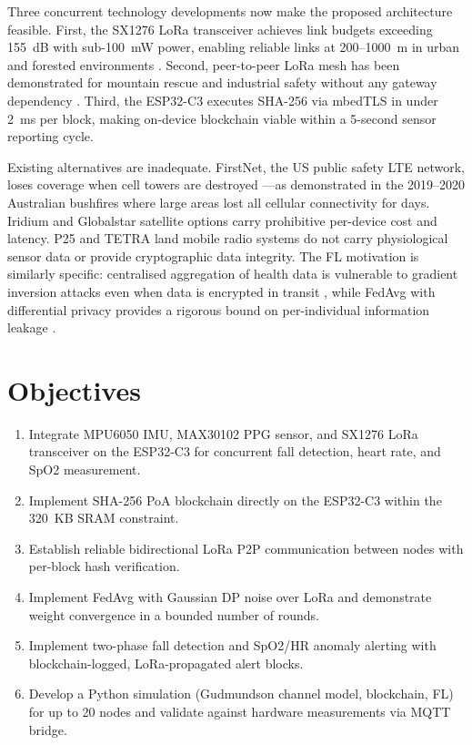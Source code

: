Three concurrent technology developments now make the proposed architecture feasible. First, the SX1276 LoRa transceiver achieves link budgets exceeding 155~dB with sub-100~mW power, enabling reliable links at 200--1000~m in urban and forested environments \cite{Semtech_SX1276_datasheet}. Second, peer-to-peer LoRa mesh has been demonstrated for mountain rescue and industrial safety without any gateway dependency \cite{LoRa_mesh_rescue_2024}. Third, the ESP32-C3 executes SHA-256 via mbedTLS in under 2~ms per block, making on-device blockchain viable within a 5-second sensor reporting cycle.

Existing alternatives are inadequate. FirstNet, the US public safety LTE network, loses coverage when cell towers are destroyed \cite{Preprints_FirstNet_5G_review}—as demonstrated in the 2019--2020 Australian bushfires where large areas lost all cellular connectivity for days. Iridium and Globalstar satellite options carry prohibitive per-device cost and latency. P25 and TETRA land mobile radio systems do not carry physiological sensor data or provide cryptographic data integrity. The FL motivation is similarly specific: centralised aggregation of health data is vulnerable to gradient inversion attacks even when data is encrypted in transit \cite{FL_privacy_threats_survey_2024}, while FedAvg with differential privacy provides a rigorous bound on per-individual information leakage \cite{FL_DP_McMahan2018}.

\section{Objectives}

\begin{enumerate}
    \item Integrate MPU6050 IMU, MAX30102 PPG sensor, and SX1276 LoRa transceiver on the ESP32-C3 for concurrent fall detection, heart rate, and SpO2 measurement.
    \item Implement SHA-256 PoA blockchain directly on the ESP32-C3 within the 320~KB SRAM constraint.
    \item Establish reliable bidirectional LoRa P2P communication between nodes with per-block hash verification.
    \item Implement FedAvg with Gaussian DP noise over LoRa and demonstrate weight convergence in a bounded number of rounds.
    \item Implement two-phase fall detection and SpO2/HR anomaly alerting with blockchain-logged, LoRa-propagated alert blocks.
    \item Develop a Python simulation (Gudmundson channel model, blockchain, FL) for up to 20 nodes and validate against hardware measurements via MQTT bridge.
\end{enumerate}

